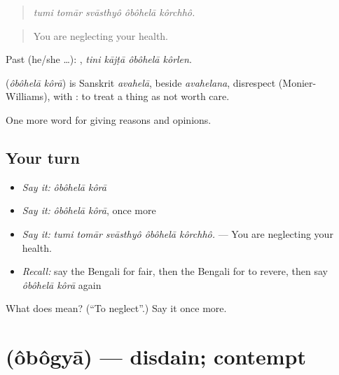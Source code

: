 \begin{quote}
    
\end{quote}

\begin{quote}
\emph{tumi tomār svāsthyô ôbôhelā kôrchhô.}
\end{quote}

\begin{quote}
You are neglecting your health.
\end{quote}

Past (he/she …):    , \emph{tini kājṭā ôbôhelā kôrlen}.

\begin{cousinweb}
\textbf{ } (\emph{ôbôhelā kôrā}) is Sanskrit \emph{avahelā}, beside \emph{avahelana}, disrespect (Monier-Williams), with : to treat a thing as not worth care.
\end{cousinweb}

\begin{grammarlens}[title={What you've built}]
One more word for giving reasons and opinions.
\end{grammarlens}

\subsection*{Your turn}
\begin{itemize}
\raggedright
  \item \emph{Say it:} \emph{ôbôhelā kôrā}
  \item \emph{Say it:} \emph{ôbôhelā kôrā}, once more
  \item \emph{Say it:} \emph{tumi tomār svāsthyô ôbôhelā kôrchhô.} — You are neglecting your health.
  \item \emph{Recall:} say the Bengali for fair, then the Bengali for to revere, then say \emph{ôbôhelā kôrā} again
\end{itemize}

\begin{tcolorbox}[breakable,colback=teal!4,colframe=teal!35!black,title={Before you move on}]
What does   mean? (\textquotedblleft{}To neglect\textquotedblright{}.) Say it once more.
\end{tcolorbox}
\section[\texorpdfstring{\bn{অবজ্ঞা} (ôbôgyā)}{অবজ্ঞা (ôbôgyā)}]{ (ôbôgyā) — disdain; contempt}

